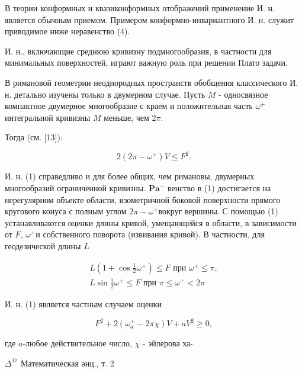 \documentclass[10pt]{article}
\begin{document}
В теории конформных и квазиконформных отображений применение И. н. является обычным приемом. Примером конформно-инвариантного И. н. служит приводимое ниже неравенство (4).



И. н., включающие среднюю кривизну подмногообразия, в частности для минимальных поверхностей, играют важную роль при решении Плато задачи.



В римановой геометрии неоднородных пространств обобщения классического И. н. детально изучены только в двумерном случае. Пусть $M$ - односвязное компактное двумерное многообразие с краем и положительная часть $\omega^{+}$интегральной кривизны $M$ меньше, чем $2 \pi$.



Тогда (см. [13]):



\[

2\left(2 \pi-\omega^{+}\right) V \leqslant F^{2} .

\]



И. н. (1) справедливо и для более общих, чем римановы, двумерных многообразий ограниченной кривизны. $\mathbf{P a}^{-}$ венство в (1) достигается на нерегулярном объекте области, изометричной боковой поверхности прямого кругового конуса с полным углом $2 \pi-\omega^{+}$вокруг вершины. С помощью (1) устанавливаются оценки длины кривой, умещающейся в области, в зависимости от $F$, $\omega^{+}$и собственного поворота (извивания кривой). В частности, для геодезической длины $L$



\[

\begin{gathered}

L\left(1+\cos \frac{1}{2} \omega^{+}\right) \leqslant F \text { при } \omega^{+} \leqslant \pi, \\

L \sin \frac{1}{2} \omega^{+} \leqslant F \text { при } \pi \leqslant \omega^{+}<2 \pi

\end{gathered}

\]



И. н. (1) является частным случаем оценки



\[

F^{2}+2\left(\omega_{a}^{+}-2 \pi \chi\right) V+a V^{2} \geqslant 0,

\]



где $a$-любое действительное число, $\chi$ - эйлерова ха-



$\Delta^{17}$ Математическая әнц., т. 2
\end{document}
